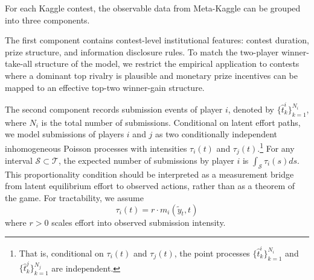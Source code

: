 \documentclass[mnsc]{informs3}
\begin{document}
For each Kaggle contest, the observable data from Meta-Kaggle can be grouped into three components.

The first component contains contest-level institutional features: contest duration, prize structure, and information disclosure rules.
To match the two-player winner-take-all structure of the model, we restrict the empirical application to contests where a dominant top rivalry is plausible and monetary prize incentives can be mapped to an effective top-two winner-gain structure.

The second component records submission events of player $i$, denoted by $\{\hat{t}^i_k\}_{k=1}^{N_i}$, where $N_i$ is the total number of submissions.
Conditional on latent effort paths, we model submissions of players $i$ and $j$ as two conditionally independent inhomogeneous Poisson processes with intensities $\tau_i(t)$ and $\tau_j(t)$.\footnote{That is, conditional on $\tau_i(t)$ and $\tau_j(t)$, the point processes $\{\hat{t}^i_k\}_{k=1}^{N_i}$ and $\{\hat{t}^j_k\}_{k=1}^{N_j}$ are independent.}
For any interval $\mathcal{S}\subset\mathcal{T}$, the expected number of submissions by player $i$ is $\int_{\mathcal{S}}\tau_i(s)ds$.
This proportionality condition should be interpreted as a measurement bridge from latent equilibrium effort to observed actions, rather than as a theorem of the game.
For tractability, we assume
\begin{equation}\label{eq-model-intensity}
\tau_i(t) = r \cdot m_i(\tilde{y}_t, t)
\end{equation}
where $r>0$ scales effort into observed submission intensity.
\end{document}
